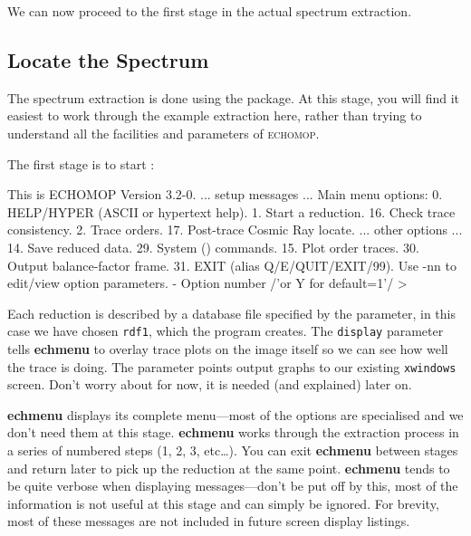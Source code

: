 \documentclass[twoside,11pt]{starlink}
\providecommand{\scspec}[2]{#1}
\begin{document}
We can now proceed to the first stage in the actual spectrum extraction.


\subsection{Locate the Spectrum}

The spectrum extraction is done using the 
package.  At this stage, you will find it easiest to work through the
example extraction here, rather than trying to understand all the
facilities and parameters of \textsc{echomop}.

The first stage is to start :

{
\scspec{\small}{ }
\begin{terminalv}
This is ECHOMOP Version 3.2-0.
 ... setup messages ...
 Main menu options:
  0. HELP/HYPER (ASCII or hypertext help).
  1. Start a reduction.                 16. Check trace consistency.
  2. Trace orders.                      17. Post-trace Cosmic Ray locate.
 ... other options ...
 14. Save reduced data.                 29. System () commands.
 15. Plot order traces.                 30. Output balance-factor frame.
                                        31. EXIT (alias Q/E/QUIT/EXIT/99).
 Use -nn to edit/view option parameters.
 - Option number /'or Y for default=1'/ >
\end{terminalv}
}

Each reduction is described by a database file specified by the
 parameter,
in this case we have chosen \verb+rdf1+, which the program creates.
The \verb+display+ parameter tells \textbf{echmenu} to overlay trace
plots  on the image itself so we can see how well the trace is doing.
The  parameter points output
graphs to our existing \verb+xwindows+ screen.
Don't worry about 
for now, it is needed (and explained) later on.

\textbf{echmenu} displays its complete menu\scspec{---}{ - }most of the options
are specialised and we don't need them at this stage.
\textbf{echmenu} works through the extraction process in a series of numbered
steps (1, 2, 3, etc\ldots).  You can exit \textbf{echmenu} between stages
and return later to pick up the reduction at the same point.
\textbf{echmenu} tends to be quite verbose when displaying
messages\scspec{---}{ - }don't be put off by this, most of the information
is not useful at this stage and can simply be ignored.
For brevity, most of these messages are not included in future screen
display listings.
\end{document}
